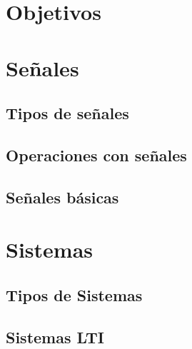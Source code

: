 \documentclass{beamer}
\begin{document}
  \portada
  \section{Objetivos}
    
  \section{Señales}
    \subsection{Tipos de señales}
      
    \subsection{Operaciones con señales}
    \subsection{Señales básicas}
  \section{Sistemas}
    \subsection{Tipos de Sistemas}
    \subsection{Sistemas LTI}
\end{document}
